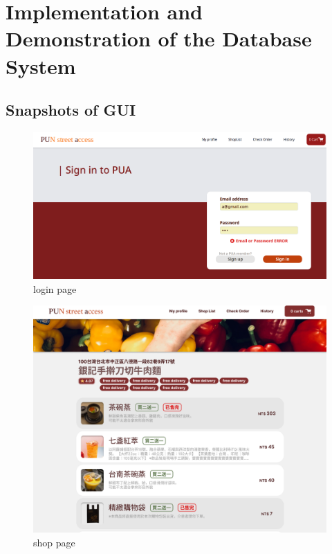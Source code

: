 \documentclass[a4paper, 12pt]{article}
\begin{document}
\section{Implementation and Demonstration of the Database System }

\subsection{Snapshots of GUI}
\begin{figure}[hp]
    \centerline{\includegraphics[width=40em]{pic/login.png}}
    \caption{login page}
    \label{fig:enter-label}
\end{figure}

\begin{figure}[hp]
    \centerline{\includegraphics[width=40em]{pic/shop.png}}
    \caption{shop page}
    \label{fig:enter-label}
\end{figure}
\end{document}
